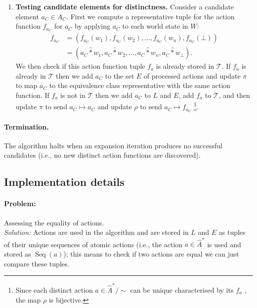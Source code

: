 \begin{enumerate}
    \item \textbf{Testing candidate elements for distinctness.}
    Consider a candidate element $a_{C} \in A_{C}$.
    First we compute a representative tuple for the action function $f_{a_{C}}$ for $a_{C}$ by applying $a_{C}$ to each world state in $W$:
    \begin{align}
        f_{a_{C}} & = (f_{a_{C}}(w_{1}), f_{a_{C}}(w_{2}), \dots, f_{a_{C}}(w_{n}), f_{a_{C}}(\bot)) \\
        & = (a_{C} \hat{\ast} w_{1}, a_{C} \hat{\ast} w_{2}, \dots, a_{C} \hat{\ast} w_{n}, a_{C} \hat{\ast} w_{\bot}).
    \end{align}
    We then check if this action function tuple $f_{a}$ is already stored in $\mathcal{T}$.
    If $f_{a}$ is already in $\mathcal{T}$ then we add $a_{C}$ to the set $E$ of processed actions and update $\pi$ to map $a_{C}$ to the equivalence class representative with the same action function.
    If $f_{a}$ is not in $\mathcal{T}$ then we add $a_{C}$ to $L$ and $E$, add $f_{a}$ to $\mathcal{T}$, and then update $\pi$ to send $a_{C} \mapsto a_{C}$ and update $\rho$ to send $a_{C} \mapsto f_{a_{C}}$ \footnote{
        Since each distinct action $a \in \hat{A}^{*}/\sim$ can be unique characterised by its $f_{a}$ , the map $\rho$ is bijective.
    }.
\end{enumerate}


\paragraph{Termination.}
The algorithm halts when an expansion iteration produces no successful candidates (i.e., no new distinct action functions are discovered).


\subsection{Implementation details}

\paragraph{Problem:}
Assessing the equality of actions.
\\\textit{Solution:}
Actions are used in the algorithm and are stored in $L$ and $E$ as tuples of their unique sequences of atomic actions (i.e., the action $a \in \hat{A}^{*}$ is used and stored as $\operatorname{Seq}(a)$); this means to check if two actions are equal we can just compare these tuples.


